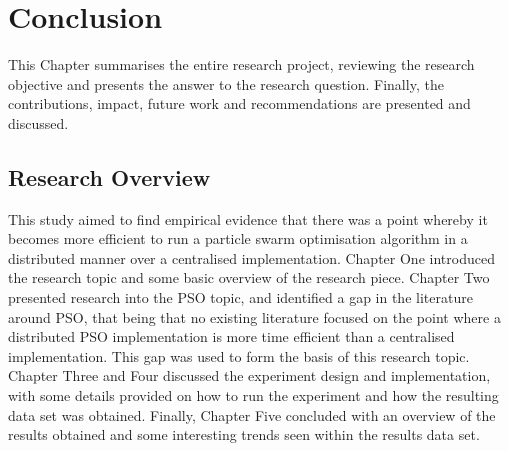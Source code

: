 \documentclass[oneside,12pt]{book}
\begin{document}
\chapter{Conclusion}
This Chapter summarises the entire research project, reviewing the research objective and presents the answer to the research question. Finally, the contributions, impact, future work and recommendations are presented and discussed. 

\section{Research Overview}
This study aimed to find empirical evidence that there was a point whereby it becomes more efficient to run a particle swarm optimisation algorithm in a distributed manner over a centralised implementation. Chapter One introduced the research topic and some basic overview of the research piece. Chapter Two presented research into the PSO topic, and identified a gap in the literature around PSO, that being that no existing literature focused on the point where a distributed PSO implementation is more time efficient than a centralised implementation. This gap was used to form the basis of this research topic. Chapter Three and Four discussed the experiment design and implementation, with some details provided on how to run the experiment and how the resulting data set was obtained. Finally, Chapter Five concluded with an overview of the results obtained and some interesting trends seen within the results data set. 
\end{document}
